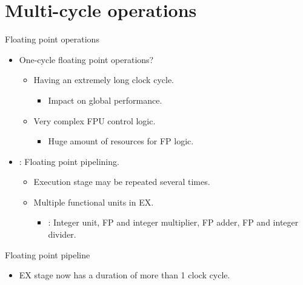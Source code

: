 \section{Multi-cycle operations}

\begin{frame}[t]{Floating point operations}
\begin{itemize}
  \item One-cycle floating point operations?
    \begin{itemize}
      \item Having an extremely long clock cycle.
        \begin{itemize}
          \item Impact on global performance.
        \end{itemize}
      \item Very complex FPU control logic.
        \begin{itemize}
          \item Huge amount of resources for FP logic.
        \end{itemize}
    \end{itemize}

  \item {}: Floating point pipelining.
    \begin{itemize}
      \item Execution stage may be repeated several times.
      \item Multiple functional units in EX.
        \begin{itemize}
          \item {}: Integer unit, FP and integer multiplier, 
                FP adder, FP and integer divider.
        \end{itemize}
    \end{itemize}
\end{itemize}
\end{frame}

\begin{frame}[t]{Floating point pipeline}
\begin{itemize}
  \item EX stage now has a duration of more than 1 clock cycle.
\end{itemize}
\makebox[\textwidth][c]{

}

\end{frame}


